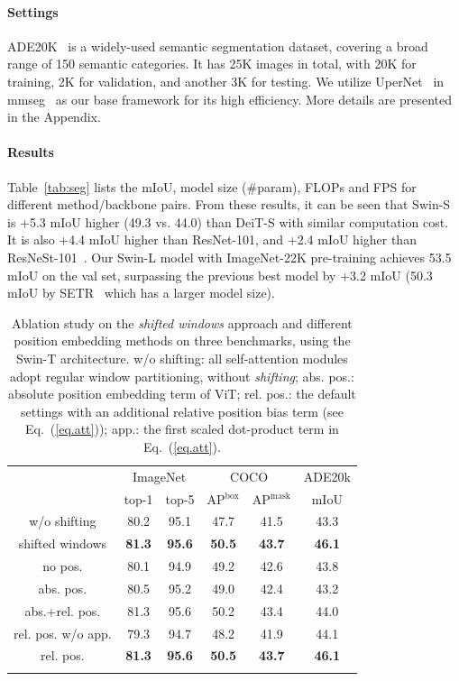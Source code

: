 \documentclass[10pt,twocolumn,letterpaper]{article}
\begin{document}
\paragraph{Settings} ADE20K~\cite{zhou2018semantic} is a widely-used semantic segmentation dataset, covering a broad range of 150 semantic categories. It has 25K images in total, with 20K for training, 2K for validation, and another 3K for testing. We utilize UperNet~\cite{xiao2018upernet} in mmseg~\cite{mmseg2020} as our base framework for its high efficiency.  More details are presented in the Appendix.

\paragraph{Results} Table~\ref{tab:seg} lists the mIoU, model size (\#param), FLOPs and FPS for different method/backbone pairs. From these results, it can be seen that Swin-S is +5.3 mIoU higher (49.3 vs. 44.0) than DeiT-S with similar computation cost. It is also +4.4 mIoU higher than ResNet-101, and +2.4 mIoU higher than ResNeSt-101~\cite{zhang2020resnest}. Our Swin-L model with ImageNet-22K pre-training achieves 53.5 mIoU on the val set, surpassing the previous best model by +3.2 mIoU (50.3 mIoU by SETR~\cite{zheng2020SETR} which has a larger model size).

\begin{table}[]
\small
\centering
\addtolength{\tabcolsep}{-2.5pt}
\begin{tabular}{c|cc|cc|c}
\Xhline{1.0pt}
 & \multicolumn{2}{c|}{ImageNet} & \multicolumn{2}{c|}{COCO} & \multicolumn{1}{c}{ADE20k} \\
 & top-1 & top-5  & AP$^\text{box}$ & AP$^\text{mask}$ & mIoU \\
\hline
w/o shifting & 80.2 & 95.1 & 47.7 & 41.5 & 43.3 \\
shifted windows & \textbf{81.3} & \textbf{95.6} & \textbf{50.5} & \textbf{43.7} & \textbf{46.1} \\
\hline
no pos. & 80.1 & 94.9 & 49.2 & 42.6  & 43.8 \\
abs. pos. & 80.5 & 95.2 & 49.0 & 42.4  & 43.2 \\
abs.+rel. pos. & 81.3 & 95.6 & 50.2 & 43.4 & 44.0\\
rel. pos. w/o app. & 79.3 & 94.7 & 48.2 & 41.9 & 44.1 \\
rel. pos. & \textbf{81.3} & \textbf{95.6} & \textbf{50.5} & \textbf{43.7} & \textbf{46.1} \\
\Xhline{1.0pt}
\end{tabular}
\caption{Ablation study on the \emph{shifted windows} approach and different position embedding methods on three benchmarks, using the Swin-T architecture. w/o shifting: all self-attention modules adopt regular window partitioning, without \emph{shifting}; abs. pos.: absolute position embedding term of ViT; rel. pos.: the default settings with an additional relative position bias term (see Eq.~(\ref{eq.att})); app.: the first scaled dot-product term in Eq.~(\ref{eq.att}).  }
\label{exp:ablation}
\normalsize
\end{table}
\end{document}
